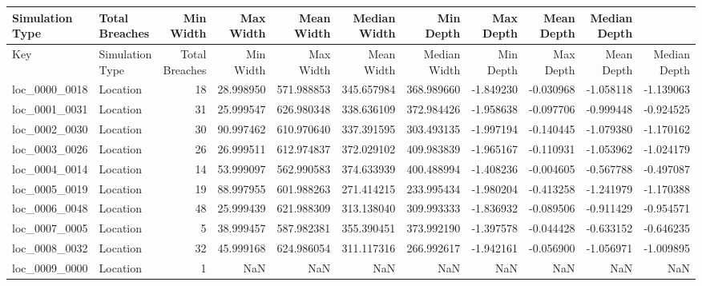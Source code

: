 \begin{tabular}{llrrrrrrrrr}
\toprule\textbf{Simulation Type} & \textbf{Total Breaches} & \textbf{Min Width} & \textbf{Max Width} & \textbf{Mean Width} & \textbf{Median Width} & \textbf{Min Depth} & \textbf{Max Depth} & \textbf{Mean Depth} & \textbf{Median Depth}\\ \midrule
          Key & Simulation Type &  Total Breaches &  Min Width &  Max Width &  Mean Width &  Median Width &  Min Depth &  Max Depth &  Mean Depth &  Median Depth \\
\midrule
loc_0000_0018 &        Location &              18 &  28.998950 & 571.988853 &  345.657984 &    368.989660 &  -1.849230 &  -0.030968 &   -1.058118 &     -1.139063 \\
loc_0001_0031 &        Location &              31 &  25.999547 & 626.980348 &  338.636109 &    372.984426 &  -1.958638 &  -0.097706 &   -0.999448 &     -0.924525 \\
loc_0002_0030 &        Location &              30 &  90.997462 & 610.970640 &  337.391595 &    303.493135 &  -1.997194 &  -0.140445 &   -1.079380 &     -1.170162 \\
loc_0003_0026 &        Location &              26 &  26.999511 & 612.974837 &  372.029102 &    409.983839 &  -1.965167 &  -0.110931 &   -1.053962 &     -1.024179 \\
loc_0004_0014 &        Location &              14 &  53.999097 & 562.990583 &  374.633939 &    400.488994 &  -1.408236 &  -0.004605 &   -0.567788 &     -0.497087 \\
loc_0005_0019 &        Location &              19 &  88.997955 & 601.988263 &  271.414215 &    233.995434 &  -1.980204 &  -0.413258 &   -1.241979 &     -1.170388 \\
loc_0006_0048 &        Location &              48 &  25.999439 & 621.988309 &  313.138040 &    309.993333 &  -1.836932 &  -0.089506 &   -0.911429 &     -0.954571 \\
loc_0007_0005 &        Location &               5 &  38.999457 & 587.982381 &  355.390451 &    373.992190 &  -1.397578 &  -0.044428 &   -0.633152 &     -0.646235 \\
loc_0008_0032 &        Location &              32 &  45.999168 & 624.986054 &  311.117316 &    266.992617 &  -1.942161 &  -0.056900 &   -1.056971 &     -1.009895 \\
loc_0009_0000 &        Location &               1 &        NaN &        NaN &         NaN &           NaN &        NaN &        NaN &         NaN &           NaN \\

\end{tabular}
